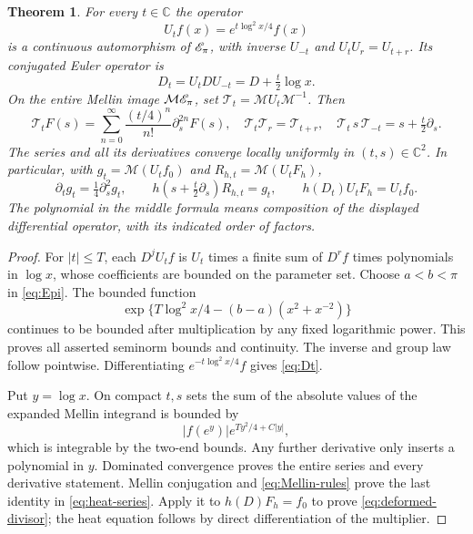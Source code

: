 \documentclass[11pt]{article}
\newcommand{\C}{\mathbb C}\newcommand{\R}{\mathbb R}
\newcommand{\Mell}{\mathcal M}\newcommand{\Sch}{\mathcal S}
\newtheorem{theorem}{Theorem}[section]
\begin{document}
\begin{theorem}\label{thm:transport}
For every $t\in\C$ the operator
\begin{equation}\label{eq:Ut}
U_tf(x)=e^{t\log^2x/4}f(x)
\end{equation}
is a continuous automorphism of $\mathscr E_\pi$, with inverse $U_{-t}$ and
$U_tU_r=U_{t+r}$. Its conjugated Euler operator is
\begin{equation}\label{eq:Dt}
D_t=U_tDU_{-t}=D+\tfrac t2\log x.
\end{equation}
On the entire Mellin image $\Mell\Epi$, set
$\mathcal T_t=\Mell U_t\Mell^{-1}$. Then
\begin{equation}\label{eq:heat-series}
\mathcal T_tF(s)
=\sum_{n=0}^{\infty}\frac{(t/4)^n}{n!}\partial_s^{2n}F(s),
\quad \mathcal T_t\mathcal T_r=\mathcal T_{t+r},\quad
\mathcal T_t\,s\,\mathcal T_{-t}=s+\tfrac t2\partial_s.
\end{equation}
The series and all its derivatives converge locally uniformly in
$(t,s)\in\C^2$. In particular, with $g_t=\Mell(U_tf_0)$ and
$R_{h,t}=\Mell(U_tF_h)$,
\begin{equation}\label{eq:deformed-divisor}
\partial_tg_t=\tfrac14\partial_s^2g_t,\qquad
h\left(s+\tfrac t2\partial_s\right)R_{h,t}=g_t,
\qquad h(D_t)U_tF_h=U_tf_0.
\end{equation}
The polynomial in the middle formula means composition of the
displayed differential operator, with its indicated order of factors.
\end{theorem}
\begin{proof}
For $|t|\leq T$, each $D^jU_tf$ is $U_t$ times a finite sum of
$D^rf$ times polynomials in $\log x$, whose coefficients are bounded
on the parameter set. Choose $a<b<\pi$ in \eqref{eq:Epi}.
The bounded function
\[
\exp\{T\log^2x/4-(b-a)(x^2+x^{-2})\}
\]
continues to be bounded after multiplication by any fixed
logarithmic power. This proves all asserted seminorm bounds and
continuity. The inverse and group law follow pointwise.
Differentiating $e^{-t\log^2x/4}f$ gives \eqref{eq:Dt}.

Put $y=\log x$. On compact $t,s$ sets the sum of the absolute
values of the expanded Mellin integrand is bounded by
\[
|f(e^y)|e^{T y^2/4+C|y|},
\]
which is integrable by the two-end bounds. Any further derivative
only inserts a polynomial in $y$. Dominated convergence proves the
entire series and every derivative statement. Mellin conjugation
and \eqref{eq:Mellin-rules} prove the last identity in
\eqref{eq:heat-series}. Apply it to $h(D)F_h=f_0$ to prove
\eqref{eq:deformed-divisor}; the heat equation follows by direct
differentiation of the multiplier.
\end{proof}
\end{document}
